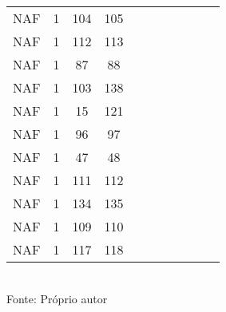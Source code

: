 \begin{table}[H]
{\begin{tabular}{ccccccccccc}
NAF & 1 & 104 & 105 &  &  &  &  &  &  &  \\
NAF & 1 & 112 & 113 &  &  &  &  &  &  &  \\
NAF & 1 & 87 & 88 &  &  &  &  &  &  &  \\
NAF & 1 & 103 & 138 &  &  &  &  &  &  &  \\
NAF & 1 & 15 & 121 &  &  &  &  &  &  &  \\
NAF & 1 & 96 & 97 &  &  &  &  &  &  &  \\
NAF & 1 & 47 & 48 &  &  &  &  &  &  &  \\
NAF & 1 & 111 & 112 &  &  &  &  &  &  &  \\
NAF & 1 & 134 & 135 &  &  &  &  &  &  &  \\
NAF & 1 & 109 & 110 &  &  &  &  &  &  &  \\
NAF & 1 & 117 & 118 &  &  &  &  &  &  &  \\
\bottomrule
\end{tabular}}
\\Fonte: Próprio autor
\end{table}


